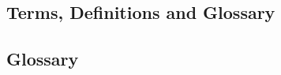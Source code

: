 \documentclass[nodraft]{ATLASPhaseII}
\begin{document}
\begin{appendices}
\backmatter


\chapter{Terms, Definitions and Glossary}
\label{cha:terms}

\listofdefinition
\listofrequirement
\listofspecification
\listofrecommendation
\listofremark
\listoftables
\listoffigures
\section{Glossary}
\label{sec:glossary}
\renewcommand{\glossarysection}[2][]{}
\printglossary[type=main]

\clearpage
\end{appendices}
\end{document}

